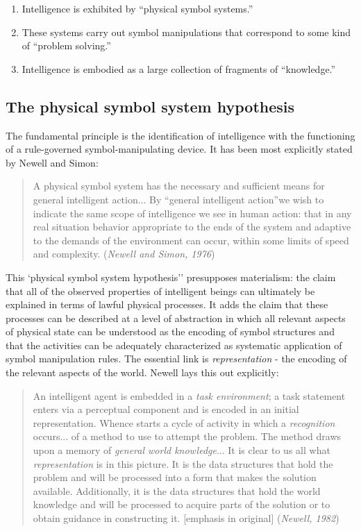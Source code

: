 \documentclass[12pt]{article}
\def\bq{\begin{quote}}
\def\eq{\end{quote}}
\begin{document}
\begin{enumerate}
\item Intelligence is exhibited by ``physical symbol systems.''
\item These systems carry out symbol manipulations that correspond to some
kind of ``problem solving.''
\item Intelligence is embodied as a large collection of fragments of
``knowledge.''
\end{enumerate}

\subsection{The physical symbol system hypothesis}

The fundamental principle is the identification of intelligence with the functioning of a rule-governed symbol-manipulating device. It has been most explicitly stated by Newell and Simon:

\bq
A physical symbol system has the necessary and sufficient means for general intelligent action... By ``general intelligent action''we wish to indicate the same scope of intelligence we see in human action: that in any real situation behavior appropriate to the ends of the system and adaptive to the demands of the environment can occur, within some limits of speed and complexity. ({\it Newell and Simon, 1976})
\eq

This `physical symbol system hypothesis'' presupposes materialism: the claim that all of the observed properties of intelligent beings can ultimately be explained in terms of lawful physical processes. It adds the claim that these processes can be described at a level of abstraction in which all relevant aspects of physical state can be understood as the encoding of symbol structures and that the activities can be adequately characterized as systematic application of symbol manipulation rules.
The essential link is {\it representation} - the encoding of the relevant aspects of the world. Newell lays this out explicitly:
\bq
An intelligent agent is embedded in a {\it task environment};  a task statement
enters via a perceptual component and is encoded in an initial
representation. Whence starts a cycle of activity in which a {\it recognition} occurs... of a method to use to attempt the problem. The method draws upon a memory of {\it general world knowledge}...
It is clear to us all what {\it representation} is in this picture. It is the data structures that hold the problem and will be processed into a form that makes the solution available. Additionally, it is the data structures that hold the world knowledge and will be processed to acquire parts of the solution or to obtain guidance in constructing it. [emphasis in original] ({\it Newell, 1982})
\eq
\end{document}
